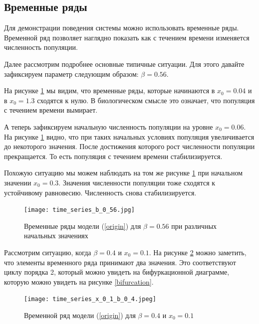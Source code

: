     \subsection{Временные ряды}

        Для демонстрации поведения системы можно использовать временные ряды. Временной ряд позволяет наглядно показать как с течением времени изменяется численность популяции.

        Далее рассмотрим подробнее основные типичные ситуации. Для этого давайте зафиксируем параметр следующим образом: \(\beta = 0.56\). 

        На рисунке \ref{time_series_b_0_56} мы видим, что временные ряды, которые начинаются в \(x_0 = 0.04\) и в \(x_0 = 1.3\) сходятся к нулю. В биологическом смысле это означает, что популяция с течением времени вымирает.

        А теперь зафиксируем начальную численность популяции на уровне \(x_0 = 0.06\). На рисунке \ref{time_series_b_0_56} видно, что при таких начальных условиях популяция увеличивается до некоторого значения. После достижения которого рост численности популяции прекращается. То есть популяция с течением времени стабилизируется.

        Похожую ситуацию мы можем наблюдать на том же рисунке \ref{time_series_b_0_56} при начальном значении \(x_0 = 0.3\). Значения численности популяции тоже сходятся к устойчивому равновесию. Численность снова стабилизируется.
    
        \begin{figure}
            \centering
            \texttt{[image: time\_series\_b\_0\_56.jpg]}

            \captionsetup{justification=centering}
            \caption{Временные ряды модели (\ref{origin}) для \(\beta = 0.56\) при различных начальных значениях}
            \label{time_series_b_0_56}
        \end{figure}

        Рассмотрим ситуацию, когда \(\beta = 0.4\) и \(x_0 = 0.1\). На рисунке \ref{time_series_x_0_1_b_0_4} можно заметить, что элементы временного ряда принимают два значения. Это соответствуют циклу порядка 2, который можно увидеть на бифуркационной диаграмме, которую можно увидеть на рисунке \ref{bifurcation}.
    
        \begin{figure}
            \centering
            \texttt{[image: time\_series\_x\_0\_1\_b\_0\_4.jpeg]}

            \captionsetup{justification=centering}
            \caption{Временной ряд модели (\ref{origin}) для \(\beta = 0.4\) и \(x_0 = 0.1\)}
            \label{time_series_x_0_1_b_0_4}
        \end{figure}

